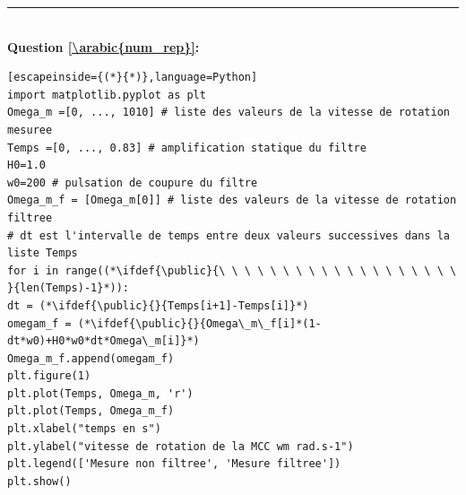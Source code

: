 \ifdef{\public}{\newpage}



\noindent
\rule{\linewidth}{.5pt}\\
\textbf{Question \ref{\arabic{num_rep}}:} ~\ \\

\begin{lstlisting}[escapeinside={(*}{*)},language=Python]
import matplotlib.pyplot as plt
Omega_m =[0, ..., 1010] # liste des valeurs de la vitesse de rotation mesuree
Temps =[0, ..., 0.83] # amplification statique du filtre
H0=1.0
w0=200 # pulsation de coupure du filtre
Omega_m_f = [Omega_m[0]] # liste des valeurs de la vitesse de rotation filtree
# dt est l'intervalle de temps entre deux valeurs successives dans la liste Temps
for i in range((*\ifdef{\public}{\ \ \ \ \ \ \ \ \ \ \ \ \ \ \ \ \ \ \ }{len(Temps)-1}*)):
dt = (*\ifdef{\public}{}{Temps[i+1]-Temps[i]}*)
omegam_f = (*\ifdef{\public}{}{Omega\_m\_f[i]*(1-dt*w0)+H0*w0*dt*Omega\_m[i]}*)
Omega_m_f.append(omegam_f)
plt.figure(1)
plt.plot(Temps, Omega_m, 'r')
plt.plot(Temps, Omega_m_f)
plt.xlabel("temps en s")
plt.ylabel("vitesse de rotation de la MCC wm rad.s-1")
plt.legend(['Mesure non filtree', 'Mesure filtree'])
plt.show()
\end{lstlisting}


\ifdef{\public}{\newpage}



